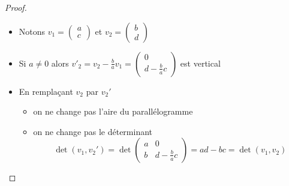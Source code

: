 \begin{frame}
\begin{proof}

\begin{itemize}
  \item Notons $v_1= \left(\begin{smallmatrix}a\\c\end{smallmatrix}\right)$ et 
$v_2= \left(\begin{smallmatrix}b\\d\end{smallmatrix}\right)$
  \item \pause Si $a\neq0$ alors $v'_2=v_2-\frac{b}{a}v_1 = \left(\begin{smallmatrix}0\\d-\frac{b}{a}c\end{smallmatrix}\right)$ est vertical

 \item \pause En remplaçant $v_2$ par $v_2'$ 
\begin{itemize}   
  \item \pause on ne change pas l'aire du parallélogramme
  \item \pause on ne change pas le déterminant
$$\det (v_1,v_2')= 
\det \begin{pmatrix}
a & 0 \\ b & d-\frac{b}{a}c
\end{pmatrix}
=ad-bc=\det(v_1,v_2)$$
\end{itemize}
\end{itemize}
\noqed\vspace*{-3ex}
\end{proof}
\end{frame}

